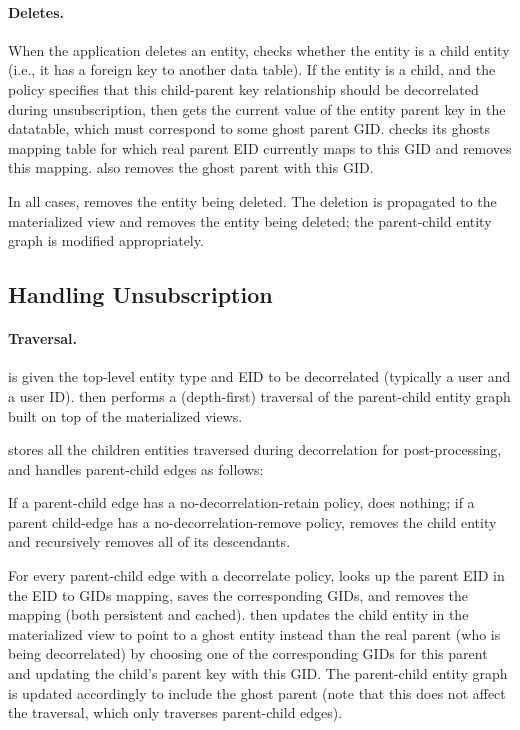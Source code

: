 \paragraph{Deletes.}
When the application deletes an entity, \sys{} checks whether
the entity is a child entity (i.e., it has a foreign key to another data table). 
If the entity is a child, and the policy specifies that this child-parent key
relationship should be decorrelated during unsubscription, then \sys{} gets the current value of the
entity parent key in the datatable, which must correspond to some ghost parent GID.
\sys{} checks its ghosts mapping table for which real parent EID currently maps to this GID and removes
this mapping. \sys{} also removes the ghost parent with this GID.

In all cases, \sys{} removes the entity being deleted.
The deletion is propagated to the materialized view and removes the entity being deleted; the
parent-child entity graph is modified appropriately.

\subsection{Handling Unsubscription}
\paragraph{Traversal.}
\sys{} is given the top-level entity type and EID to be decorrelated (typically a user and a user ID).
\sys{} then performs a (depth-first) traversal of the parent-child entity graph built on top of the materialized
views. 

\sys{} stores all the children entities traversed during decorrelation for post-processing, and
handles parent-child edges as follows:

If a parent-child edge has a no-decorrelation-retain policy, \sys{} does nothing; if a parent child-edge has a
no-decorrelation-remove policy, \sys{} removes the child entity and recursively removes all of its
descendants. 

For every parent-child edge with a decorrelate policy, \sys{} looks up the parent EID in the
EID to GIDs mapping, saves the corresponding GIDs, and removes the mapping (both persistent and
cached).
\sys{} then updates the child entity in the materialized view to point to a ghost entity instead
than the real parent (who is being decorrelated) by choosing one of the corresponding GIDs for this
parent and updating the child's parent key with this GID.  The parent-child entity graph is updated
accordingly to include the ghost parent (note that this does not affect the traversal, which only
traverses parent-child edges).

